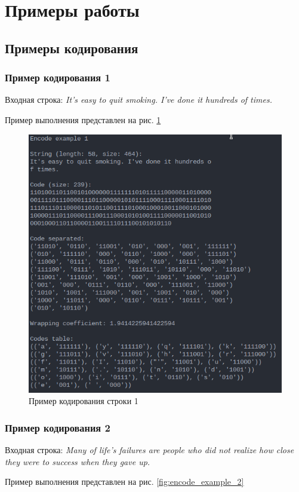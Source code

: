 \section{Примеры работы}


\subsection{Примеры кодирования}


\subsubsection*{Пример кодирования 1}

Входная строка: \textit{It's easy to quit smoking. I've done it hundreds of times.}

Пример выполнения представлен на рис. \ref{fig:encode_example_1}

\begin{figure}[H]
    \centering
    \includegraphics[width=0.7\linewidth]{photo/encode_example_1}
    \caption{Пример кодирования строки 1}
    \label{fig:encode_example_1}
\end{figure}

\subsubsection*{Пример кодирования 2}

Входная строка: \textit{Many of life's failures are people who did not realize how close they were to success when they gave up.}

Пример выполнения представлен на рис. \ref{fig:encode_example_2}

